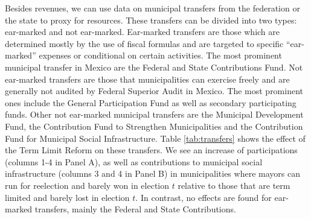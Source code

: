 \documentclass[12pt]{amsart}
\numberwithin{equation}{section}
\theoremstyle{definition}
\theoremstyle{definition}
\theoremstyle{definition}
\begin{document}
 Besides revenues, we can use data on municipal transfers from the federation or the state to proxy for resources. These transfers can be divided into two types: ear-marked and not ear-marked. Ear-marked transfers are those which are determined mostly by the use of fiscal formulas and are targeted to specific ``ear-marked'' expenses or conditional on certain activities. The most prominent municipal transfer in Mexico are the Federal and State Contributions Fund. Not ear-marked transfers are those that municipalities can exercise freely and are generally not audited by Federal Superior Audit in Mexico. The most prominent ones include the General Participation Fund as well as secondary participating funds. Other not ear-marked municipal transfers are the Municipal Development Fund, the Contribution Fund to Strengthen Municipalities and the Contribution Fund for Municipal Social Infrastructure. Table \ref{tab:transfers} shows the effect of the Term Limit Reform on these transfers. We see an increase of participations (columns 1-4 in Panel A), as well as contributions to municipal social infrastructure (columns 3 and 4 in Panel B)  in municipalities where mayors can run for reelection and barely won in election $t$ relative to those that are term limited and barely lost in election $t$. In contrast, no effects are found for ear-marked transfers, mainly the Federal and State Contributions. 
   
\end{document}
